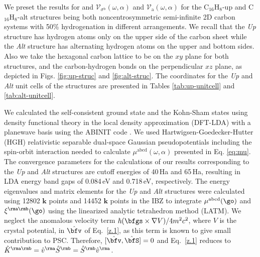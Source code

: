 \documentclass[prb,11pt,tightenlines,twocolumn,aps]{revtex4-1}
\begin{document}
We preset the results for 
and
$\mathcal{V}_{\sigma^{\mathrm{b}}}(\omega,\alpha)$ 
and
$\mathcal{V}_{\mathrm{a}}(\omega,\alpha)$ 
for the
C$_{16}$H$_{8}$-up  and C$_{16}$H$_{8}$-alt 
structures being both
noncentrosymmetric semi-infinite 2D carbon systems with 50\% hydrogenation in
different arrangements. We recall that the \emph{Up} structure has hydrogen
atoms only on the upper side of the carbon sheet while the \emph{Alt} structure
has alternating hydrogen atoms on the upper and bottom sides. Also we take the
hexagonal carbon lattice to be on the $xy$ plane for both structures, and the
carbon-hydrogen bonds on the perpendicular $xz$ plane, as depicted in Figs.
\ref{fig:up-struc} and \ref{fig:alt-struc}. The coordinates for the
\emph{Up} and \emph{Alt} unit cells of the structures are presented in Tables
\ref{tab:up-unitcell} and \ref{tab:alt-unitcell}. 

We calculated the self-consistent ground state and the Kohn-Sham
states using density functional theory in the local density approximation 
(DFT-LDA) with a planewave basis using the ABINIT code \cite{gonzeCPC09}.
% 
We used Hartwigsen-Goedecker-Hutter (HGH) relativistic separable dual-space
Gaussian pseudopotentials \cite{hartwigsenPRB98} including the spin-orbit
interaction needed to calculate $\mu^{\mathrm{abcd}}(\omega,\alpha)$ presented
in Eq. \eqref{eq:mu}.
% 
The convergence parameters for the calculations of our results corresponding to
the \emph{Up} and \emph{Alt} structures are cutoff energies of 40\,Ha and
65\,Ha, resulting in LDA energy band gaps of 0.084\,eV and 0.718\,eV,
respectively. The energy eigenvalues and matrix elements for the \emph{Up} and
\emph{Alt} structures were calculated using 12802 $\mathbf{k}$ points and 14452
$\mathbf{k}$ points in the IBZ to integrate $\mu^{\mathrm{abcd}}(\go)$ and
$\xi^{\rma\rmb}(\go)$ using the linearized analytic tetrahedron method
(LATM).\cite{nastosPRB07} We neglect the anomalous velocity term
$\hbar(\bfgs\times\nabla V)/4m^2c^2$, where $V$ is the crystal potential, in
$\hat\bfv$ of Eq.~\eqref{z.1}, as this term is known to give small contribution
to PSC.\cite{bhatPRL05} Therefore, $[\hat\bfv,\hat\bfS]=0$ and Eq.~\eqref{z.1}
reduces to $\hat K^{\rma\rmb}=\hat v^\rma \hat S^\rmb=\hat S^\rmb \hat v^\rma$.


% 
\end{document}
